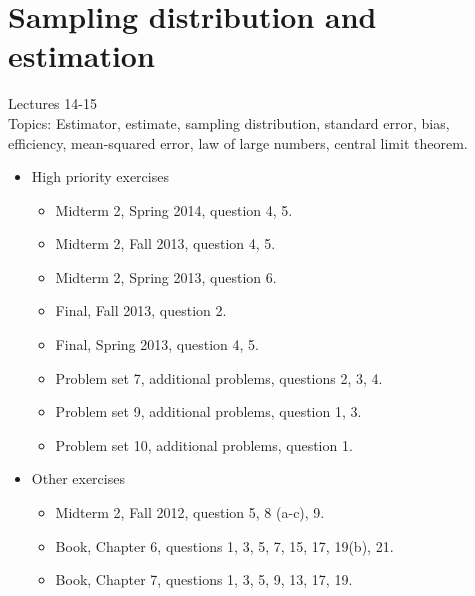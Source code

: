 \documentclass[11pt]{article}
\begin{document}
\section{Sampling distribution and estimation}
Lectures 14-15 \\[0.2in]
Topics: Estimator, estimate, sampling distribution, standard error, bias, efficiency, mean-squared error, law of large numbers, central limit theorem.
\begin{itemize}
	\item High priority exercises
		\begin{itemize}
			\item Midterm 2, Spring 2014, question 4, 5.
			\item Midterm 2, Fall 2013, question 4, 5.
			\item Midterm 2, Spring 2013, question 6.
			\item Final, Fall 2013, question 2.
			\item Final, Spring 2013, question 4, 5.
			\item Problem set 7, additional problems, questions 2, 3, 4.
			\item Problem set 9, additional problems, question 1, 3.
			\item Problem set 10, additional problems, question 1.
		\end{itemize}
	\item Other exercises
	\begin{itemize}
		\item Midterm 2, Fall 2012, question 5, 8 (a-c), 9.
		\item Book, Chapter 6, questions 1, 3, 5, 7, 15, 17, 19(b), 21.
		\item Book, Chapter 7, questions 1, 3, 5, 9, 13, 17, 19.
	\end{itemize}
\end{itemize}
\end{document}
